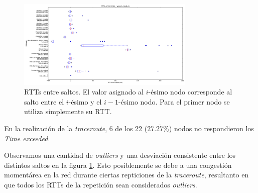 
\begin{figure}[H]
    \centering
    \includegraphics[width=8.5cm]{img/grafico1-www2-ulaval-ca.pdf}
    \caption{\normalfont RTTs entre saltos. El valor asignado al $i$-ésimo nodo corresponde al salto entre el $i$-ésimo y el $i - 1$-ésimo nodo. Para el primer nodo se utiliza simplemente su RTT.}
    \label{graf1L}
\end{figure}

\par En la realización de la \textit{traceroute}, 6 de los 22 ($27.\overline{27}\%$) nodos no respondieron los \textit{Time exceeded}.

\par Observamos una cantidad de \textit{outliers} y una desviación consistente entre los distintos saltos en la figura \ref{graf1L}.
Esto posiblemente se debe a una congestión momentárea en la red durante ciertas repticiones de la \textit{traceroute}, resultanto en que todos los RTTs de la repetición sean considerados \textit{outliers}.

